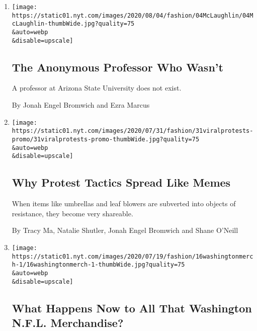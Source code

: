 \begin{enumerate}
\def\labelenumi{\arabic{enumi}.}
\item
  \href{/2020/08/04/style/college-coronavirus-hoax.html}{}

  \texttt{[image: https://static01.nyt.com/images/2020/08/04/fashion/04McLaughlin/04McLaughlin-thumbWide.jpg?quality=75\\\&auto=webp\\\&disable=upscale]}

  \hypertarget{the-anonymous-professor-who-wasnt}{%
  \subsection{The Anonymous Professor Who
  Wasn't}\label{the-anonymous-professor-who-wasnt}}

  A professor at Arizona State University does not exist.

  By Jonah Engel Bromwich and Ezra Marcus
\item
  \href{/2020/07/31/style/viral-protest-videos.html}{}

  \texttt{[image: https://static01.nyt.com/images/2020/07/31/fashion/31viralprotests-promo/31viralprotests-promo-thumbWide.jpg?quality=75\\\&auto=webp\\\&disable=upscale]}

  \hypertarget{why-protest-tactics-spread-like-memes}{%
  \subsection{Why Protest Tactics Spread Like
  Memes}\label{why-protest-tactics-spread-like-memes}}

  When items like umbrellas and leaf blowers are subverted into objects
  of resistance, they become very shareable.

  By Tracy Ma, Natalie Shutler, Jonah Engel Bromwich and Shane O'Neill
\item
  \href{/2020/07/16/style/washington-redskins-name-change-merchandise.html}{}

  \texttt{[image: https://static01.nyt.com/images/2020/07/19/fashion/16washingtonmerch-1/16washingtonmerch-1-thumbWide.jpg?quality=75\\\&auto=webp\\\&disable=upscale]}

  \hypertarget{what-happens-now-to-all-that-washington-nfl-merchandise}{%
  \subsection{What Happens Now to All That Washington N.F.L.
  Merchandise?}\label{what-happens-now-to-all-that-washington-nfl-merchandise}}


\end{enumerate}
